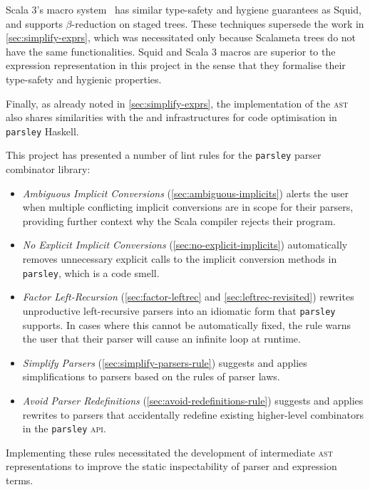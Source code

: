 \documentclass[../../main.tex]{subfiles}
\begin{document}
Scala 3's macro system~\cite{stucki_multi-stage_2021} has similar type-safety and hygiene guarantees as Squid, and supports $\beta$-reduction on staged  trees.
These techniques supersede the work in \cref{sec:simplify-exprs}, which was necessitated only because Scalameta trees do not have the same functionalities.
Squid and Scala 3 macros are superior to the expression representation in this project in the sense that they formalise their type-safety and hygienic properties.

Finally, as already noted in \cref{sec:simplify-exprs}, the implementation of the  \textsc{ast} also shares similarities with the  and  infrastructures for code optimisation in \texttt{parsley} Haskell.

This project has presented a number of lint rules for the \texttt{parsley} parser combinator library:
\begin{itemize}
  \item \emph{Ambiguous Implicit Conversions} (\cref{sec:ambiguous-implicits}) alerts the user when multiple conflicting implicit conversions are in scope for their parsers, providing further context why the Scala compiler rejects their program.
  \item \emph{No Explicit Implicit Conversions} (\cref{sec:no-explicit-implicits}) automatically removes unnecessary explicit calls to the implicit conversion methods in \texttt{parsley}, which is a code smell.
  \item \emph{Factor Left-Recursion} (\cref{sec:factor-leftrec} and \cref{sec:leftrec-revisited}) rewrites unproductive left-recursive parsers into an idiomatic form that \texttt{parsley} supports. In cases where this cannot be automatically fixed, the rule warns the user that their parser will cause an infinite loop at runtime.
  \item \emph{Simplify Parsers} (\cref{sec:simplify-parsers-rule}) suggests and applies simplifications to parsers based on the rules of parser laws.
  \item \emph{Avoid Parser Redefinitions} (\cref{sec:avoid-redefinitions-rule}) suggests and applies rewrites to parsers that accidentally redefine existing higher-level combinators in the \texttt{parsley} \textsc{api}.
\end{itemize}
%
Implementing these rules necessitated the development of intermediate \textsc{ast} representations to improve the static inspectability of parser and expression terms.
\end{document}
